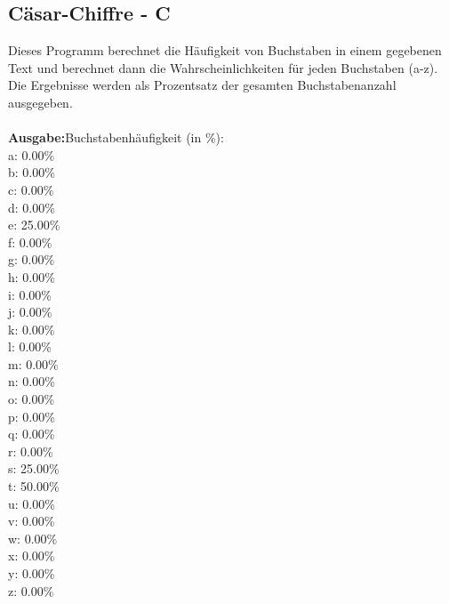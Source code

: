 \subsection*{Cäsar-Chiffre - C}
Dieses Programm berechnet die Häufigkeit von Buchstaben in einem gegebenen Text und berechnet dann die Wahrscheinlichkeiten für jeden Buchstaben (a-z). Die Ergebnisse werden als Prozentsatz der gesamten Buchstabenanzahl ausgegeben.\\\\
\textbf{Ausgabe:}\quad Buchstabenhäufigkeit (in \%):\\
a: 0.00\%\\
b: 0.00\%\\
c: 0.00\%\\
d: 0.00\%\\
e: 25.00\%\\
f: 0.00\%\\
g: 0.00\%\\
h: 0.00\%\\
i: 0.00\%\\
j: 0.00\%\\
k: 0.00\%\\
l: 0.00\%\\
m: 0.00\%\\
n: 0.00\%\\
o: 0.00\%\\
p: 0.00\%\\
q: 0.00\%\\
r: 0.00\%\\
s: 25.00\%\\
t: 50.00\%\\
u: 0.00\%\\
v: 0.00\%\\
w: 0.00\%\\
x: 0.00\%\\
y: 0.00\%\\
z: 0.00\%\\
\begin{codeblock}
    
\end{codeblock}

